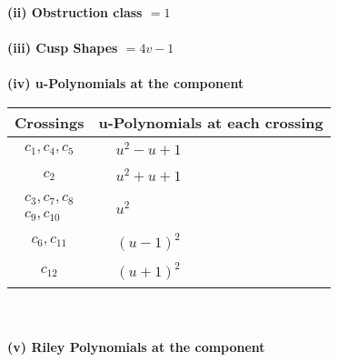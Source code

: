 \documentclass[1p]{elsarticle_modified}
\theoremstyle{definition}
\begin{document}
\flushleft \textbf{(ii) Obstruction class $= 1$}\\~\\
\flushleft \textbf{(iii) Cusp Shapes $= 4 v-1$}\\~\\
\newpage\renewcommand{\arraystretch}{1}
\flushleft \textbf{(iv) u-Polynomials at the component}\newline \\
\begin{tabular}{m{50pt}|m{274pt}}
Crossings & \hspace{64pt}u-Polynomials at each crossing \\
\hline $$\begin{aligned}c_{1},c_{4},c_{5}\end{aligned}$$&$\begin{aligned}
&u^2- u+1
\end{aligned}$\\
\hline $$\begin{aligned}c_{2}\end{aligned}$$&$\begin{aligned}
&u^2+u+1
\end{aligned}$\\
\hline $$\begin{aligned}c_{3},c_{7},c_{8}\\c_{9},c_{10}\end{aligned}$$&$\begin{aligned}
&u^2
\end{aligned}$\\
\hline $$\begin{aligned}c_{6},c_{11}\end{aligned}$$&$\begin{aligned}
&(u-1)^2
\end{aligned}$\\
\hline $$\begin{aligned}c_{12}\end{aligned}$$&$\begin{aligned}
&(u+1)^2
\end{aligned}$\\
\hline
\end{tabular}\\~\\
\newpage\renewcommand{\arraystretch}{1}
\flushleft \textbf{(v) Riley Polynomials at the component}\newline \\
\end{document}
